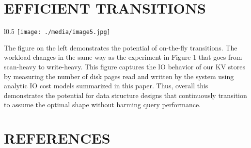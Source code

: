 \documentclass[a4paper,12pt,notitlepage,twoside,openright]{article}
\begin{document}
\newpage
\hypertarget{efficienttransitions}{%
\section{EFFICIENT TRANSITIONS}\label{efficienttransitions}}

\begin{wrapfigure}{l}{0.5\columnwidth}
\texttt{[image: ./media/image5.jpg]}
\end{wrapfigure}The
figure on the left demonstrates the potential of on-the-fly transitions.
The workload changes in the same way as the experiment in Figure 1 that
goes from scan-heavy to write-heavy. This figure captures the IO behavior
of our KV stores by measuring the number of disk pages read and
written by the system using analytic IO cost models summarized in this
paper. Thus, overall this demonstrates the potential for data structure
designs that continuously transition to assume the optimal shape without
harming query performance.

\hypertarget{references}{%
\section{REFERENCES}\label{references}}
\end{document}
